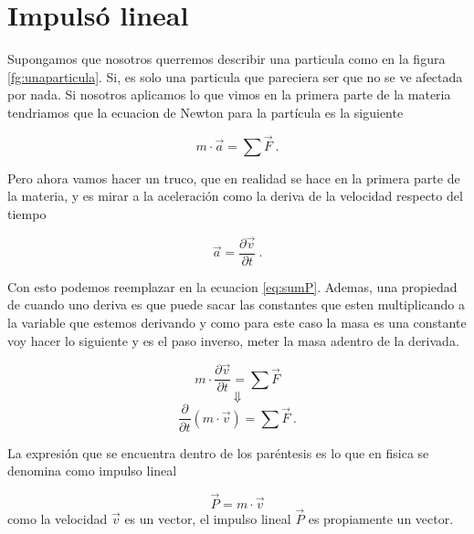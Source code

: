 \documentclass[../Main.tex]{subfiles}
\begin{document}
\begin{minipage}[t]{0.6\textwidth}

\section{Impulsó lineal}

Supongamos que nosotros querremos describir una particula como en la 
figura \ref{fg:unaparticula}. Si, es solo una particula que pareciera ser
que no se ve afectada por nada. Si nosotros aplicamos lo que vimos en la
primera parte de la materia tendriamos que la ecuacion de Newton para la
partícula es la siguiente

\begin{equation}
    m \cdot \vec{a} = \sum \vec{F} \ .
\label{eq:sumP}
\end{equation}

Pero ahora vamos hacer un truco, que en realidad se hace en la primera parte de 
la materia, y es mirar a la aceleración como la deriva de la velocidad respecto
del tiempo

\begin{equation}
    \vec{a} = \frac{\partial \vec{v}}{\partial t} \ .
\end{equation}

Con esto podemos reemplazar en la ecuacion \ref{eq:sumP}. Ademas, una propiedad
de cuando uno deriva es que puede sacar las constantes que esten multiplicando
a la variable que estemos derivando y como para este caso la masa es una
constante voy hacer lo siguiente y es el paso inverso, meter la masa adentro de
la derivada.

\begin{equation}
    m \cdot \frac{\partial \vec{v}}{\partial t} = \sum \vec{F}
\end{equation}
\begin{equation*}
    \Downarrow
\end{equation*}
\begin{equation*}
    \frac{\partial}{\partial t} \left( m \cdot \vec{v} \right) = \sum \vec{F} \ .
\end{equation*}

La expresión que se encuentra dentro de los paréntesis es lo que en fisica se 
denomina como impulso lineal

\begin{equation}
    \vec{P} = m \cdot \vec{v}
\label{eq:impLineal}
\end{equation}
como la velocidad $\vec{v}$ es un vector, el impulso lineal $\vec{P}$ es
propiamente un vector.


\end{minipage}
\end{document}
